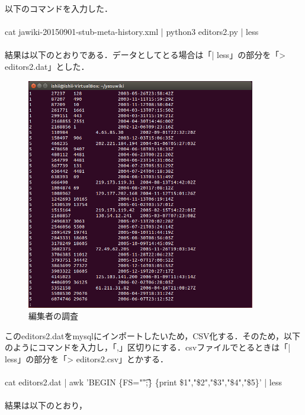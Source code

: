 以下のコマンドを入力した．\\
\\
cat jawiki-20150901-stub-meta-history.xml | python3 editors2.py | less \\
\\
結果は以下のとおりである．データとしてとる場合は「| less」の部分を「> editors2.dat」とした． \\


\begin{figure}[H]
\centering
\includegraphics[width=10cm]{editors2_data.png}
\caption{編集者の調査}\label{サンプル図}
\end{figure}


このeditors2.datをmysqlにインポートしたいため，CSV化する．そのため，以下のようにコマンドを入力し，「,」区切りにする．csvファイルでとるときは「| less」の部分を「> editors2.csv」とかする．\\
\\
cat editors2.dat | awk 'BEGIN \{FS="\t";\} \{print \$1","\$2","\$3","\$4","\$5\}' | less \\
\\
結果は以下のとおり，

